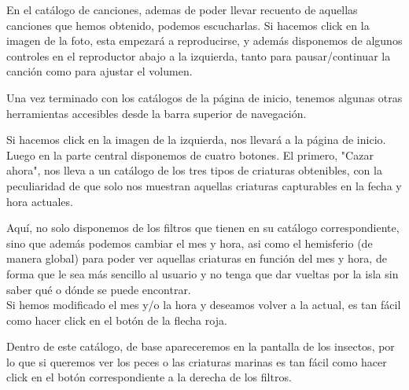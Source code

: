 
En el catálogo de canciones, ademas de poder llevar recuento de aquellas canciones que hemos obtenido, podemos escucharlas. Si hacemos click en la imagen de la foto, esta empezará a reproducirse, y además disponemos de algunos controles en el reproductor abajo a la izquierda, tanto para pausar/continuar la canción como para ajustar el volumen.\\


Una vez terminado con los catálogos de la página de inicio, tenemos algunas otras herramientas accesibles desde la barra superior de navegación.\\


Si hacemos click en la imagen de la izquierda, nos llevará a la página de inicio. Luego en la parte central disponemos de cuatro botones. El primero, "Cazar ahora", nos lleva a un catálogo de los tres tipos de criaturas obtenibles, con la peculiaridad de que solo nos muestran aquellas criaturas capturables en la fecha y hora actuales.\\


Aquí, no solo disponemos de los filtros que tienen en su catálogo correspondiente, sino que además podemos cambiar el mes y hora, asi como el hemisferio (de manera global) para poder ver aquellas criaturas en función del mes y hora, de forma que le sea más sencillo al usuario y no tenga que dar vueltas por la isla sin saber qué o dónde se puede encontrar.\\

Si hemos modificado el mes y/o la hora y deseamos volver a la actual, es tan fácil como hacer click en el botón de la flecha roja.\\


Dentro de este catálogo, de base apareceremos en la pantalla de los insectos, por lo que si queremos ver los peces o las criaturas marinas es tan fácil como hacer click en el botón correspondiente a la derecha de los filtros.\\

